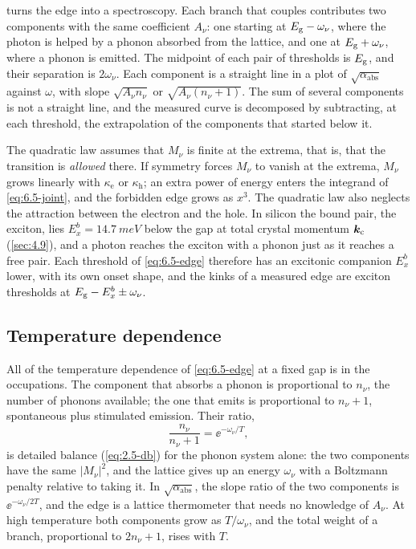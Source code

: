  turns the edge into a spectroscopy. Each branch that couples contributes two components with the same coefficient $A_\nu$: one starting at $E_{\mathrm{g}} - \omega_\nu$, where the photon is helped by a phonon absorbed from the lattice, and one at $E_{\mathrm{g}} + \omega_\nu$, where a phonon is emitted. The midpoint of each pair of thresholds is $E_{\mathrm{g}}$, and their separation is $2\omega_\nu$. Each component is a straight line in a plot of $\sqrt{\alpha_{\mathrm{abs}}}$ against $\omega$, with slope $\sqrt{A_\nu n_\nu}$ or $\sqrt{A_\nu(n_\nu + 1)}$. The sum of several components is not a straight line, and the measured curve is decomposed by subtracting, at each threshold, the extrapolation of the components that started below it.

The quadratic law assumes that $M_\nu$ is finite at the extrema, that is, that the transition is \emph{allowed} there. If symmetry forces $M_\nu$ to vanish at the extrema, $M_\nu$ grows linearly with $\kappa_{\mathrm{e}}$ or $\kappa_{\mathrm{h}}$; an extra power of energy enters the integrand of \cref{eq:6.5-joint}, and the forbidden edge grows as $x^3$. The quadratic law also neglects the attraction between the electron and the hole. In silicon the bound pair, the exciton, lies $E_x^b = \SI{14.7}{meV}$ below the gap at total crystal momentum $\bm{k}_{\mathrm{c}}$ (\cref{sec:4.9}), and a photon reaches the exciton with a phonon just as it reaches a free pair. Each threshold of \cref{eq:6.5-edge} therefore has an excitonic companion $E_x^b$ lower, with its own onset shape, and the kinks of a measured edge are exciton thresholds at $E_{\mathrm{g}} - E_x^b \pm \omega_\nu$.

\subsection{Temperature dependence}

All of the temperature dependence of \cref{eq:6.5-edge} at a fixed gap is in the occupations. The component that absorbs a phonon is proportional to $n_\nu$, the number of phonons available; the one that emits is proportional to $n_\nu + 1$, spontaneous plus stimulated emission. Their ratio,
\begin{equation}
  \frac{n_\nu}{n_\nu + 1} = \ee^{-\omega_\nu/T} ,
  \label{eq:6.5-ratio}
\end{equation}
is detailed balance (\cref{eq:2.5-db}) for the phonon system alone: the two components have the same $|M_\nu|^2$, and the lattice gives up an energy $\omega_\nu$ with a Boltzmann penalty relative to taking it. In $\sqrt{\alpha_{\mathrm{abs}}}$, the slope ratio of the two components is $\ee^{-\omega_\nu/2T}$, and the edge is a lattice thermometer that needs no knowledge of $A_\nu$. At high temperature both components grow as $T/\omega_\nu$, and the total weight of a branch, proportional to $2n_\nu + 1$, rises with $T$.

